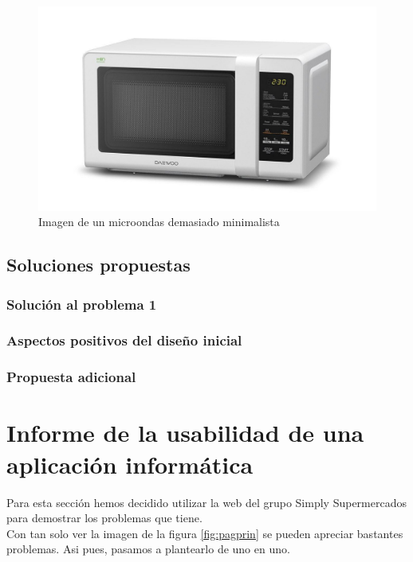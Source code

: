 \documentclass[a4paper,11pt]{article}
\begin{document}
\begin{figure}[h!]
 \centering
 \includegraphics[scale=0.35]{microondas.png}
 \caption{Imagen de un microondas demasiado minimalista}
 \label{fig:imgsenales}
\end{figure}


\subsection{Soluciones propuestas}
\subsubsection{Solución al problema 1}


\subsubsection{Aspectos positivos del diseño inicial}
\subsubsection{Propuesta adicional}




\section{Informe de la usabilidad de una aplicación informática}
Para esta sección hemos decidido utilizar la web del grupo Simply Supermercados \cite{webSimply} para demostrar los problemas que tiene.\\
Con tan solo ver la imagen de la figura \ref{fig:pagprin} se pueden apreciar bastantes problemas. Asi pues, pasamos a plantearlo de uno en uno.
\end{document}

